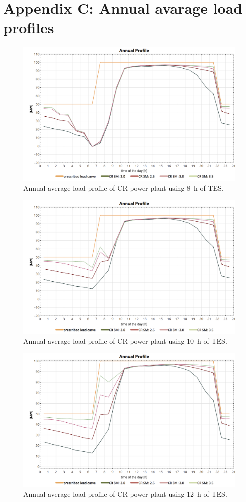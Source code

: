 \chapter{Appendix C: Annual avarage load profiles} \label{all_load_profile}
%
\begin{figure}[htbp]  
\centering
\includegraphics[width=0.8\linewidth]{FIG/Appendix_LCC/CR8h}
\caption[Annual average load profile of CR power plant using 8~h of TES.]{Annual average load profile of CR power plant using 8~h of TES.}\label{CR8h}
\end{figure}
%
\begin{figure}[htbp]  
\centering
\includegraphics[width=0.8\linewidth]{FIG/Appendix_LCC/CR10h}
\caption[Annual average load profile of CR power plant using 10~h of TES.]{Annual average load profile of CR power plant using 10~h of TES.}\label{CR10h}
\end{figure}
%
\begin{figure}[htbp]  
\centering
\includegraphics[width=0.8\linewidth]{FIG/Appendix_LCC/CR12h}
\caption[Annual average load profile of CR power plant using 12~h of TES.]{Annual average load profile of CR power plant using 12~h of TES.}\label{CR12h}
\end{figure}
